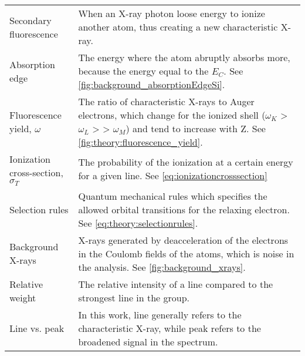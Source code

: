 \begin{table}[phb]
\begin{center}
\begin{tabular}{p{3cm}p{11.6cm}}
            Secondary fluorescence               & When an X-ray photon loose energy to ionize another atom, thus creating a new characteristic X-ray.                                                                                                         \\
            Absorption edge                      & The energy where the atom abruptly absorbs more, because the energy equal to the $E_C$.  See \cref{fig:background_absorptionEdgeSi}.                                                                        \\
            Fluorescence yield, $\omega$         & The ratio of characteristic X-rays to Auger electrons, which change for the ionized shell ($\omega_K$ > $\omega_L$ > > $\omega_M$) and tend to increase with Z.  See  \cref{fig:theory:fluorescence_yield}. \\
            Ionization cross-section, $\sigma_T$ & The probability of the ionization at a certain energy for a given line. See \cref{eq:ionizationcrosssection}                                                                                                \\
            Selection rules                      & Quantum mechanical rules which specifies the allowed orbital transitions for the relaxing electron. See \cref{eq:theory:selectionrules}.                                                                    \\
            Background X-rays                    & X-rays generated by deacceleration of the electrons in the Coulomb fields of the atoms, which is noise in the analysis. See \cref{fig:background_xrays}.                                                    \\
            Relative weight                      & The relative intensity of a line compared to the strongest line in the group.                                                                                                                               \\
            Line vs. peak                        & In this work, line generally refers to the characteristic X-ray, while peak refers to the broadened signal in the spectrum.                                                                                           \\
            \hline
        \end{tabular}
    \end{center}
\end{table}